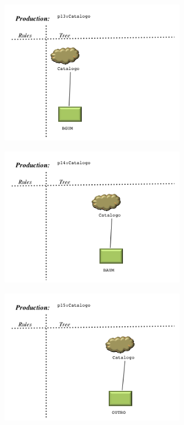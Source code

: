 \begin{figure}[!htb]
  \centering
    \includegraphics[width=0.7\textwidth]{./imagens/VisualLisa/__p13_Catalogo.png}
\end{figure}
\begin{figure}[!htb]
  \centering
    \includegraphics[width=0.7\textwidth]{./imagens/VisualLisa/__p14_Catalogo.png}
\end{figure}
\begin{figure}[!htb]
  \centering
    \includegraphics[width=0.7\textwidth]{./imagens/VisualLisa/__p15_Catalogo.png}
\end{figure}
